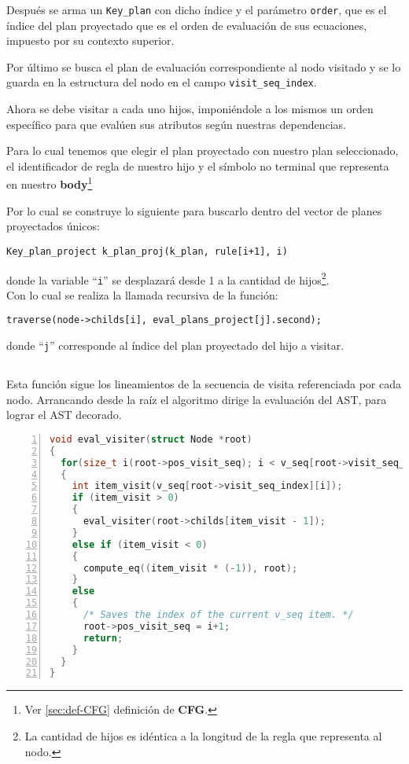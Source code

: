 Después se arma un \texttt{Key\_plan} con dicho índice y el parámetro \texttt{order}, que es el índice del plan proyectado que es el orden de evaluación de sus ecuaciones, impuesto por su contexto superior.

Por último se busca el plan de evaluación correspondiente al nodo visitado y se lo guarda en la estructura del nodo en el campo \texttt{visit\_seq\_index}.

Ahora se debe visitar a cada uno hijos, imponiéndole a los mismos un orden específico para que evalúen sus atributos según nuestras dependencias.

Para lo cual tenemos que elegir el plan proyectado con nuestro plan seleccionado, el identificador de regla de nuestro hijo y el símbolo no terminal que representa en nuestro \textbf{body}\footnote{Ver \ref{sec:def-CFG} definición de \textbf{CFG}.}

Por lo cual se construye lo siguiente para buscarlo dentro del vector de planes proyectados únicos:

\begin{center}\texttt{Key\_plan\_project k\_plan\_proj(k\_plan, rule[i+1], i)}\end{center}

donde la variable ``\texttt{i}'' se desplazará desde 1 a la cantidad de hijos\footnote{La cantidad de hijos es idéntica a la longitud de la regla que representa al nodo.}.\\

Con lo cual se realiza la llamada recursiva de la función:

\begin{center}\texttt{traverse(node->childs[i], eval\_plans\_project[j].second);}\end{center}

donde ``\texttt{j}'' corresponde al índice del plan proyectado del hijo a visitar.

\subsection*{}

Esta función sigue los lineamientos de la secuencia de visita referenciada por cada nodo. Arrancando desde la raíz el algoritmo dirige la evaluación del AST, para lograr el AST decorado.

\vspace*{0.2cm}

\begin{lstlisting}[language=C++, basicstyle=\scriptsize, numbers=left, columns=fullflexible, linewidth=13cm]
void eval_visiter(struct Node *root)
{
  for(size_t i(root->pos_visit_seq); i < v_seq[root->visit_seq_index].size(); i++)
  {
    int item_visit(v_seq[root->visit_seq_index][i]);
    if (item_visit > 0)
    {
      eval_visiter(root->childs[item_visit - 1]);
    }
    else if (item_visit < 0)
    {
      compute_eq((item_visit * (-1)), root);
    }
    else
    {
      /* Saves the index of the current v_seq item. */
      root->pos_visit_seq = i+1;
      return;
    }
  }
}
\end{lstlisting}


